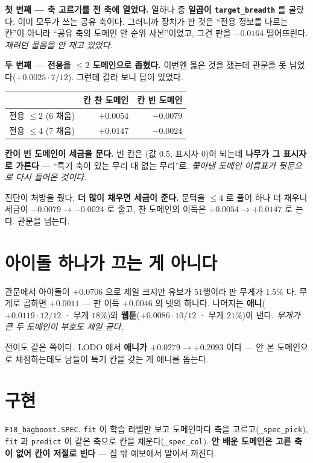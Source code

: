 \documentclass[11pt]{article}
\begin{document}
\textbf{첫 번째 --- 축 고르기를 전 축에 열었다.} 열하나 중 \textbf{일곱이
\texttt{target\_breadth}} 를 골랐다. 이미 모두가 쓰는 공유 축이다. 그러니까
장치가 판 것은 ``전용 정보를 나르는 칸''이 아니라 ``공유 축의 도메인 안
순위 사본''이었고, 그건 판을 $\mathbf{-0.0164}$ 떨어뜨린다. \emph{재려던
물음을 안 재고 있었다.}

\textbf{두 번째 --- 전용을 $\le 2$ 도메인으로 좁혔다.} 이번엔 옳은 것을
쟀는데 관문을 못 넘었다($+0.0025 \cdot 7/12$). 그런데 갈라 보니 답이
있었다.

\begin{center}
\begin{tabular}{lrr}
\hline
 & 칸 찬 도메인 & 칸 빈 도메인 \\
\hline
전용 $\le 2$ (6 채움) & $+0.0054$ & $-0.0079$ \\
전용 $\le 4$ (7 채움) & $\mathbf{+0.0147}$ & $-0.0024$ \\
\hline
\end{tabular}
\end{center}

\textbf{칸이 빈 도메인이 세금을 문다.} 빈 칸은 (값 $0.5$, 표시자 $0$)이
되는데 \textbf{나무가 그 표시자로 가른다} --- ``특기 축이 있는 무리 대
없는 무리''로. \emph{쫓아낸 도메인 이름표가 뒷문으로 다시 들어온 것이다.}

진단이 처방을 줬다. \textbf{더 많이 채우면 세금이 준다.} 문턱을 $\le 4$
로 풀어 하나 더 채우니 세금이 $-0.0079 \to -0.0024$ 로 줄고, 찬 도메인의
이득은 $+0.0054 \to +0.0147$ 로 는다. 관문을 넘는다.

\section{아이돌 하나가 끄는 게 아니다}

관문에서 아이돌이 $+0.0706$ 으로 제일 크지만 유보가 $51$행이라 판 무게가
$1.5\%$ 다. 무게로 곱하면 $+0.0011$ --- 판 이득 $+0.0046$ 의 넷의 하나다.
나머지는 \textbf{애니}($+0.0119 \cdot 12/12$ · 무게 $18\%$)와
\textbf{웹툰}($+0.0086 \cdot 10/12$ · 무게 $21\%$)이 낸다. \emph{무게가
큰 두 도메인이 부호도 제일 곧다.}

전이도 같은 쪽이다. LODO 에서 \textbf{애니가 $+0.0279 \to +0.2093$} 이다
--- 안 본 도메인으로 채점하는데도 남들이 특기 칸을 갖는 게 애니를 돕는다.

\section{구현}

\texttt{F18\_bagboost.SPEC}. \texttt{fit} 이 학습 라벨만 보고 도메인마다
축을 고르고(\texttt{\_spec\_pick}), \texttt{fit} 과 \texttt{predict} 이
같은 축으로 칸을 채운다(\texttt{\_spec\_col}). \textbf{안 배운 도메인은
고른 축이 없어 칸이 저절로 빈다} --- 집 밖 예보에서 알아서 꺼진다.
\end{document}
